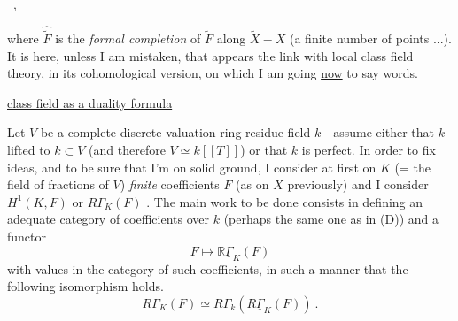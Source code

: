 
\ ,

where $\hat{\tilde{F}}$ is the \emph{formal completion} of $\tilde{F}$ along $\tilde{X} - X$ (a finite number of
points ...). It is here, unless I am mistaken, that appears the link with
local class field theory, in its cohomological version, on which I am going
\uline{now} to say  words. \hand{$*\qquad *\qquad *$}

 \uline{ class field  as a duality formula}

Let $V$ be a complete discrete valuation ring  residue field $k$ - assume
either that $k$  lifted to $k \subset V$ (and therefore $V \simeq k[[T]]$) or
that $k$ is perfect. In order to fix ideas, and to be sure that I'm on solid
ground, I consider at first on $K$ (= the field of fractions of $V$) \emph{finite}
coefficients $F$ (as on $X$ previously) and I consider  $H^1(K, F)$\hand{,} or
$R\Gamma_K(F)$ . The main work to be done consists in defining an adequate category
of coefficients over $k$ (perhaps the same one as in (D)) and a functor
\[ F \longmapsto \mathbb{R}\underline{\Gamma}_K(F) \]
with values in the category of such coefficients, in such a manner that the
following isomorphism holds.
\[ R\Gamma_K(F) \simeq R\Gamma_k(R\underline{\Gamma}_K(F)) \ . \]

